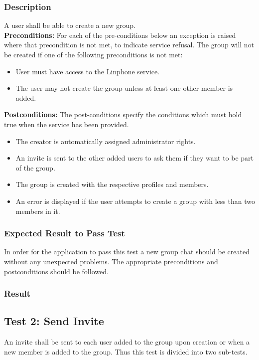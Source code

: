 \documentclass[11pt]{article}
\begin{document}
\subsubsection{Description}
A user shall be able to create a new group.\\
\textbf{Preconditions:} For each of the pre-conditions below an exception is raised where that precondition is not met, to indicate service refusal.
The group will not be created if one of the following preconditions is not met:
\begin{itemize}
\item User must have access to the Linphone service.
\item The user may not create the group unless at least one other member is added.
\end{itemize}
\textbf{Postconditions:} The post-conditions specify the conditions which must hold true when the service has been provided.
\begin{itemize}
\item The creator is automatically assigned administrator rights.
\item An invite is sent to the other added users to ask them if they want to be part of the group.
\item The group is created with the respective profiles and members.
\item An error is displayed if the user attempts to create a group with less than two members in it.
\end{itemize}

\subsubsection{Expected Result to Pass Test}
In order for the application to pass this test a new group chat should be created without any unexpected problems. The appropriate preconditions and postconditions should be followed.
\subsubsection{Result}


\subsection{Test 2: Send Invite}
An invite shall be sent to each user added to the group upon creation or when a new member is added to the group. Thus this test is divided into two sub-tests.
\end{document}
